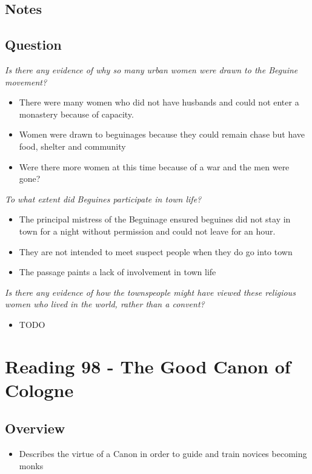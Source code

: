 \documentclass[12pt]{article}
\begin{document}
{\subsection*{Notes}

\subsection*{Question}

\textit{Is there any evidence of why so many urban women were drawn to the Beguine movement?}
\begin{itemize}
	\item There were many women who did not have husbands and could not enter a monastery because of capacity. 
	\item Women were drawn to beguinages because they could remain chase but have food, shelter and community
	\item Were there more women at this time because of a war and the men were gone?
\end{itemize}

\textit{To what extent did Beguines participate in town life?}
\begin{itemize}
	\item The principal mistress of the Beguinage ensured beguines did not stay in town for a night without permission and could not leave for an hour.
	\item They are not intended to meet suspect people when they do go into town
	\item The passage paints a lack of involvement in town life
\end{itemize}

\textit{Is there any evidence of how the townspeople might have viewed these religious women who lived in the world, rather than a convent?}
\begin{itemize}
	\item TODO
\end{itemize}

\section*{Reading 98 - The Good Canon of Cologne}

\subsection*{Overview}
\begin{itemize}
	\item Describes the virtue of a Canon in order to guide and train novices becoming monks
\end{itemize}

}
\end{document}
